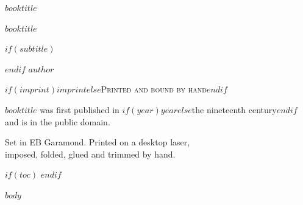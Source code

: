 \documentclass[$if(fontsize)$$fontsize$$else$10.5pt$endif$,twoside,openright]{memoir}
\makeatletter
\newif\ifbp@started
\let\bp@part\part
\let\bp@chapter\chapter
\renewcommand{\part}{\bp@begin\bp@part}
\renewcommand{\chapter}{\bp@begin\bp@chapter}
\newcommand{\bp@begin}{%
  \ifbp@started\else\global\bp@startedtrue\mainmatter\pagestyle{bookpress}\fi}
\makeatother
\begin{document}
\frontmatter
\pagestyle{empty}

\begin{vplace}[0.35]
\begin{center}
  {\Large\scshape $booktitle$}
\end{center}
\end{vplace}
\cleardoublepage

\begin{vplace}[0.35]
\begin{center}
  {\HUGE\scshape $booktitle$}\par
  $if(subtitle)$\vspace{1.5\onelineskip}{\large\itshape $subtitle$}\par$endif$
  \vspace{3\onelineskip}
  {\large $author$}\par
  \vfill
  {\small\scshape $if(imprint)$$imprint$$else$Printed and bound by hand$endif$}\par
\end{center}
\end{vplace}
\cleardoublepage

\thispagestyle{empty}
\begin{vplace}[0.75]
\begin{center}\small
  $booktitle$ was first published in $if(year)$$year$$else$the nineteenth century$endif$\\
  and is in the public domain.\par
  \vspace{\onelineskip}
  Set in EB Garamond. Printed on a desktop laser,\\
  imposed, folded, glued and trimmed by hand.\par
\end{center}
\end{vplace}
\cleardoublepage

$if(toc)$
\pagestyle{bookpress}
\tableofcontents*
\cleardoublepage
$endif$

$body$
\end{document}
